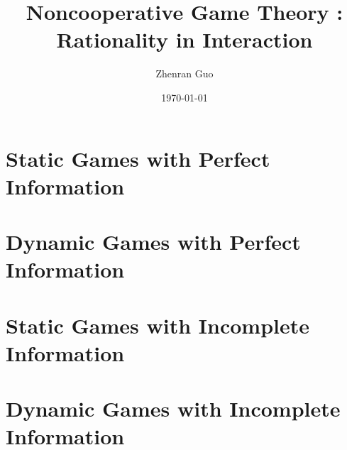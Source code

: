\documentclass{myBook}
\title{Noncooperative Game Theory : Rationality in Interaction}
\author{Zhenran Guo}
\date{\today}
\begin{document}
\frontmatter



\maketitle\pagebreak





\tableofcontents

\mainmatter



\part{Static Games with Perfect Information}


\part{Dynamic Games with Perfect Information}


\part{Static Games with Incomplete Information}


\part{Dynamic Games with Incomplete Information}


\appendix








\end{document}
